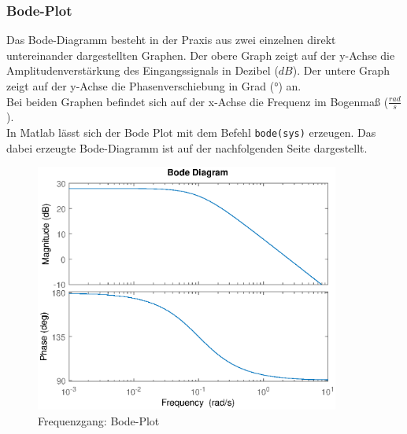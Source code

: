 \subsubsection{Bode-Plot}
Das Bode-Diagramm besteht in der Praxis aus zwei einzelnen direkt untereinander dargestellten Graphen. Der obere Graph zeigt auf der y-Achse die Amplitudenverstärkung des Eingangssignals in Dezibel ($dB$). Der untere Graph zeigt auf der y-Achse die Phasenverschiebung in Grad (°) an.\\
Bei beiden Graphen befindet sich auf der x-Achse die Frequenz im Bogenmaß ($\frac{rad}{s}$).\\
In Matlab lässt sich der Bode Plot mit dem Befehl \texttt{bode(sys)} erzeugen. Das dabei erzeugte Bode-Diagramm ist auf der nachfolgenden Seite dargestellt.
\begin{figure}[H]
    \centering
    \includegraphics[width=10cm]{images_2/Frequenzgang/bode.eps}
    \caption{Frequenzgang: Bode-Plot}
\end{figure}
